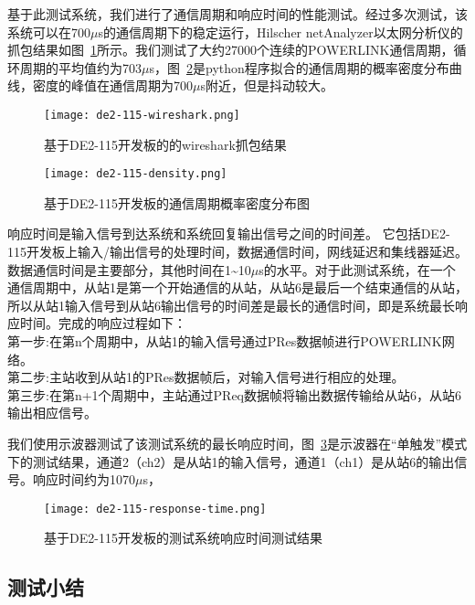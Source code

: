 基于此测试系统，我们进行了通信周期和响应时间的性能测试。经过多次测试，该系统可以在700$\mu$s的通信周期下的稳定运行，Hilscher netAnalyzer以太网分析仪的抓包结果如图~\ref{fig:de2-115-wireshark}所示。我们测试了大约27000个连续的POWERLINK通信周期，循环周期的平均值约为703$\mu$s，图~\ref{fig:de2-115-density}是python程序拟合的通信周期的概率密度分布曲线，密度的峰值在通信周期为700$\mu$s附近，但是抖动较大。

\begin{figure}[!htb]
  \centering
  \texttt{[image: de2-115-wireshark.png]}
  \caption{基于DE2-115开发板的的wireshark抓包结果}
  \label{fig:de2-115-wireshark}
\end{figure}

\begin{figure}[!htb]
  \centering
  \texttt{[image: de2-115-density.png]}
  \caption{基于DE2-115开发板的通信周期概率密度分布图}
  \label{fig:de2-115-density}
\end{figure}

响应时间是输入信号到达系统和系统回复输出信号之间的时间差。 它包括DE2-115开发板上输入/输出信号的处理时间，数据通信时间，网线延迟和集线器延迟。 数据通信时间是主要部分，其他时间在1\~{}10$\mu$s的水平。对于此测试系统，在一个通信周期中，从站1是第一个开始通信的从站，从站6是最后一个结束通信的从站，所以从站1输入信号到从站6输出信号的时间差是最长的通信时间，即是系统最长响应时间。完成的响应过程如下：\\
第一步:在第n个周期中，从站1的输入信号通过PRes数据帧进行POWERLINK网络。\\
第二步:主站收到从站1的PRes数据帧后，对输入信号进行相应的处理。\\
第三步:在第n+1个周期中，主站通过PReq数据帧将输出数据传输给从站6，从站6输出相应信号。

我们使用示波器测试了该测试系统的最长响应时间，图~\ref{fig:de2-115-response-time}是示波器在“单触发”模式下的测试结果，通道2（ch2）是从站1的输入信号，通道1（ch1）是从站6的输出信号。响应时间约为1070$\mu$s，

\begin{figure}[!htb]
  \centering
  \texttt{[image: de2-115-response-time.png]}
  \caption{基于DE2-115开发板的测试系统响应时间测试结果}
  \label{fig:de2-115-response-time}
\end{figure}

\subsection{测试小结}

